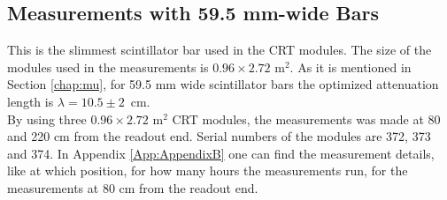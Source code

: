 \documentclass[a4paper]{article}\linespread{1.4}
\begin{document}
\subsection{Measurements with 59.5 mm-wide Bars} 
This is the slimmest scintillator bar used in the CRT modules. The size of the modules used in the measurements is $0.96 \times 2.72$ $\mathrm{m^{2}}$. As it is mentioned in Section \ref{chap:mu}, for 59.5 mm wide scintillator bars the optimized attenuation length is $\lambda=10.5\pm2$~cm.
\\By using three $0.96 \times 2.72$ $\mathrm{m^{2}}$ CRT modules, the measurements was made at 80 and 220 cm from the readout end. Serial numbers of the modules are 372, 373 and 374. In Appendix \ref{App:AppendixB} one can find the measurement details, like at which position, for how many hours the measurements run, for the measurements at 80 cm from the readout end.
\end{document}
